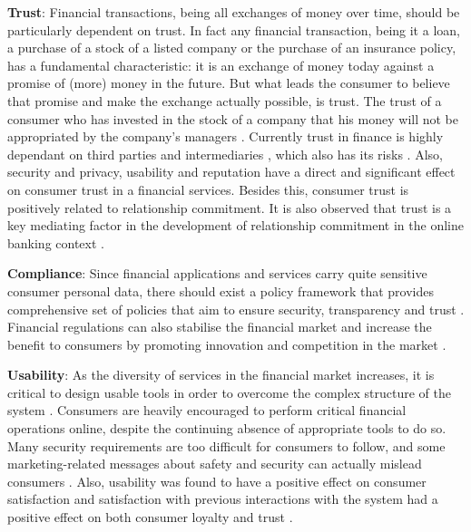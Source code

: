 \textbf{Trust}: Financial transactions, being all exchanges of money over time, should be particularly dependent on trust. In fact any financial transaction, being it a loan, a purchase of a stock of a listed company or the purchase of an insurance policy, has a fundamental characteristic: it is an exchange of money today against a promise of (more) money in the future. But what leads the consumer to believe that promise and make the exchange actually possible, is trust. The trust of a consumer who has invested in the stock of a company that his money will not be appropriated by the company's managers \cite{trust_finance_insurancemarkets}. Currently trust in finance is highly dependant on third parties and intermediaries \cite{third_party_fin,intermediaries}, which also has its risks \cite{third_party_risks}. Also, security and privacy, usability and reputation have a direct and significant effect on consumer trust in a financial services. Besides this, consumer trust is positively related to relationship commitment. It is also observed that trust is a key mediating factor in the development of relationship commitment in the online banking context \cite{fin_trust}.\newline

\textbf{Compliance}: Since financial applications and services carry quite sensitive consumer personal data, there should exist a policy framework that provides comprehensive set of policies that aim to ensure security, transparency and trust \cite{fin_compliance_1}. Financial regulations can also stabilise the financial market and increase the benefit to consumers by promoting innovation and competition in the market \cite{fin_compliance_2}. \newline

\textbf{Usability}: As the diversity of services in the financial market increases, it is critical to design usable tools in order to overcome the complex structure of the system \cite{fin_usability_2}. Consumers are heavily encouraged to perform critical financial operations online, despite the continuing absence of appropriate tools to do so. Many security requirements are too difficult for consumers to follow, and some marketing-related messages about safety and security can actually mislead consumers \cite{fin_usability_1}. Also, usability was found to have a positive effect on consumer satisfaction and satisfaction with previous interactions with the system had a positive effect on both consumer loyalty and trust \cite{fin_usability_3}. 

